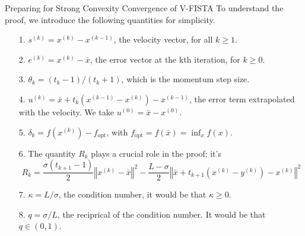 \documentclass[11pt]{beamer}
\theoremstyle{definition}
\begin{document}
    \begin{frame}{Preparing for Strong Convexity Convergence of V-FISTA}
        To understand the proof, we introduce the following quantities for simplicity. 
        \begin{itemize}
            \item [1.] $s^{(k)} = x^{(k)} - x^{(k - 1)}$, the velocity vector,
            for all $k\ge 1$. 
            \item [2.] $e^{(k)} = x^{(k)} - \bar x$, the error vector at the kth iteration, for $k \ge 0$. 
            \item [3.] $\theta_k = (t_k -1)/(t_k + 1)$, which is the momentum step size. 
            \item [4.] $u^{(k)} = \bar x + t_{k}(x^{(k - 1)} - x^{(k)}) - x^{(k - 1)}$, the error term extrapolated with the velocity. We take $u^{(0)} = \bar x - x^{(0)}$. 
            \item [5.] $\delta_k = f(x^{(k)}) - f_{\text{opt}}$, with $f_{\text{opt}} = f(\bar x) = \inf_x f(x)$. 
            \item [6.] The quantity $R_k$ plays a crucial role in the proof; it's
            {\small
                $$
                R_k = 
                \frac{\sigma(t_{k + 1} - 1)}{2}
                \left\Vert
                    x^{(k)} - \bar x
                \right\Vert^2 
                - 
                \frac{L - \sigma}{2}
                \left\Vert
                    \bar x + t_{k + 1}\left( x^{(k)} - y^{(k)}\right) - x^{(k)}
                \right\Vert^2
                $$
            }
            \item [7.] $\kappa = L/\sigma$, the condition number, it would be that $\kappa \ge 0$. 
            \item [8.] $q = \sigma/L$, the reciprical of the condition number. It would be that $q \in (0, 1)$. 
        \end{itemize}

    \end{frame}
\end{document}
